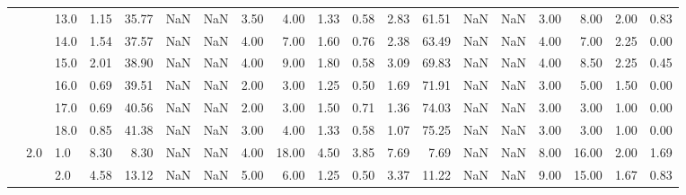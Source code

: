 \begin{tabular}{lllrrrrrrrrrrrrrrrr}
          &     & 13.0 &      1.15 &      35.77 &               NaN &                NaN &  3.50 &   4.00 &             1.33 &                         0.58 &      2.83 &      61.51 &               NaN &                NaN &  3.00 &   8.00 &             2.00 &                         0.83 \\
          &     & 14.0 &      1.54 &      37.57 &               NaN &                NaN &  4.00 &   7.00 &             1.60 &                         0.76 &      2.38 &      63.49 &               NaN &                NaN &  4.00 &   7.00 &             2.25 &                         0.00 \\
          &     & 15.0 &      2.01 &      38.90 &               NaN &                NaN &  4.00 &   9.00 &             1.80 &                         0.58 &      3.09 &      69.83 &               NaN &                NaN &  4.00 &   8.50 &             2.25 &                         0.45 \\
          &     & 16.0 &      0.69 &      39.51 &               NaN &                NaN &  2.00 &   3.00 &             1.25 &                         0.50 &      1.69 &      71.91 &               NaN &                NaN &  3.00 &   5.00 &             1.50 &                         0.00 \\
          &     & 17.0 &      0.69 &      40.56 &               NaN &                NaN &  2.00 &   3.00 &             1.50 &                         0.71 &      1.36 &      74.03 &               NaN &                NaN &  3.00 &   3.00 &             1.00 &                         0.00 \\
          &     & 18.0 &      0.85 &      41.38 &               NaN &                NaN &  3.00 &   4.00 &             1.33 &                         0.58 &      1.07 &      75.25 &               NaN &                NaN &  3.00 &   3.00 &             1.00 &                         0.00 \\
          & 2.0 & 1.0  &      8.30 &       8.30 &               NaN &                NaN &  4.00 &  18.00 &             4.50 &                         3.85 &      7.69 &       7.69 &               NaN &                NaN &  8.00 &  16.00 &             2.00 &                         1.69 \\
          &     & 2.0  &      4.58 &      13.12 &               NaN &                NaN &  5.00 &   6.00 &             1.25 &                         0.50 &      3.37 &      11.22 &               NaN &                NaN &  9.00 &  15.00 &             1.67 &                         0.83 \\

\end{tabular}
